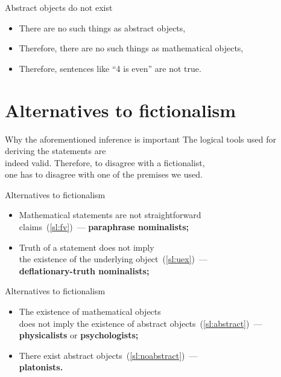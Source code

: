 \documentclass[12pt,aspectratio=169,svgnames]{beamer}
\begin{document}
\begin{frame}{Abstract objects do not exist} \label{sl:noabstract}
\begin{itemize}
	\item There are no such things as abstract objects,
	\item Therefore, there are no such things as mathematical objects,
	\item Therefore, sentences like “4 is even” are not true.
\end{itemize}
\end{frame}

\section{Alternatives to fictionalism}

\begin{frame}{Why the aforementioned inference is important}
	The logical tools used for deriving the statements are \\
	indeed valid. Therefore, to disagree with a fictionalist, \\
	one has to disagree with one of the premises we used.
\end{frame}

\begin{frame}{Alternatives to fictionalism}
\begin{itemize}
	\item Mathematical statements are not straightforward \\
	claims~(\ref{sl:fv})~— {\bf paraphrase nominalists;} \bigskip

	\item Truth of a statement does not imply \\
	the existence of the underlying object~(\ref{sl:uex})~— \\
	{\bf deflationary-truth nominalists;}
\end{itemize}
\end{frame}

\begin{frame}{Alternatives to fictionalism}
\begin{itemize}
	\item The existence of mathematical objects \\
	does not imply the existence of abstract objects~(\ref{sl:abstract})~—\\
	{\bf physicalists} or {\bf psychologists;} \bigskip

	\item There exist abstract objects~(\ref{sl:noabstract})~—\\
	{\bf platonists.}
\end{itemize}
\end{frame}
\end{document}
